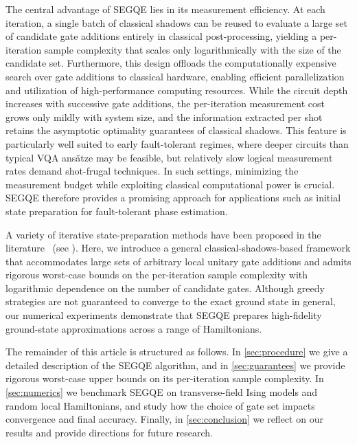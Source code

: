 The central advantage of SEGQE lies in its measurement efficiency. At each iteration, a single batch of classical shadows can be reused to evaluate a large set of candidate gate additions entirely in classical post-processing, yielding a per-iteration sample complexity that scales only logarithmically with the size of the candidate set. Furthermore, this design offloads the computationally expensive search over gate additions to classical hardware, enabling efficient parallelization and utilization of high-performance computing resources. While the circuit depth increases with successive gate additions, the per-iteration measurement cost grows only mildly with system size, and the information extracted per shot retains the asymptotic optimality guarantees of classical shadows. This feature is particularly well suited to early fault-tolerant regimes, where deeper circuits than typical VQA ansätze may be feasible, but relatively slow logical measurement rates demand shot-frugal techniques. In such settings, minimizing the measurement budget while exploiting classical computational power is crucial. SEGQE therefore provides a promising approach for applications such as initial state preparation for fault-tolerant phase estimation. 

A variety of iterative state-preparation methods have been proposed in the literature~\cite{motta2020determining, grimsley2019adaptive, feniou2025greedy} (see ). Here, we introduce a general classical-shadows-based framework that accommodates large sets of arbitrary local unitary gate additions and admits rigorous worst-case bounds on the per-iteration sample complexity with logarithmic dependence on the number of candidate gates. Although greedy strategies are not guaranteed to converge to the exact ground state in general, our numerical experiments demonstrate that SEGQE prepares high-fidelity ground-state approximations across a range of Hamiltonians.

The remainder of this article is structured as follows. In \cref{sec:procedure} we give a detailed description of the SEGQE algorithm, and in \cref{sec:guarantees} we provide rigorous worst-case upper bounds on its per-iteration sample complexity. In \cref{sec:numerics} we benchmark SEGQE on transverse-field Ising models and random local Hamiltonians, and study how the choice of gate set impacts convergence and final accuracy. Finally, in \cref{sec:conclusion} we reflect on our results and provide directions for future research. 

